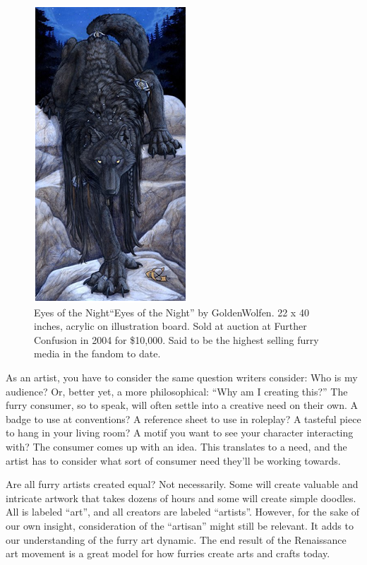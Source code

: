 \begin{figure}
  \begin{center}
    \includegraphics{content/assets/furry-art--eyesofthenight}
  \end{center}
  \caption{Eyes of the Night``Eyes of the Night'' by GoldenWolfen. 22 x 40 inches, acrylic on illustration board. Sold at auction at Further Confusion in 2004 for \$10,000. Said to be the highest selling furry media in the fandom to date.}
\end{figure}

As an artist, you have to consider the same question writers consider: Who is my audience? Or, better yet, a more philosophical: ``Why am I creating this?'' The furry consumer, so to speak, will often settle into a creative need on their own. A badge to use at conventions? A reference sheet to use in roleplay? A tasteful piece to hang in your living room? A motif you want to see your character interacting with? The consumer comes up with an idea. This translates to a need, and the artist has to consider what sort of consumer need they'll be working towards.

Are all furry artists created equal? Not necessarily. Some will create valuable and intricate artwork that takes dozens of hours and some will create simple doodles. All is labeled ``art'', and all creators are labeled ``artists''. However, for the sake of our own insight, consideration of the ``artisan'' might still be relevant. It adds to our understanding of the furry art dynamic. The end result of the Renaissance art movement is a great model for how furries create arts and crafts today.
